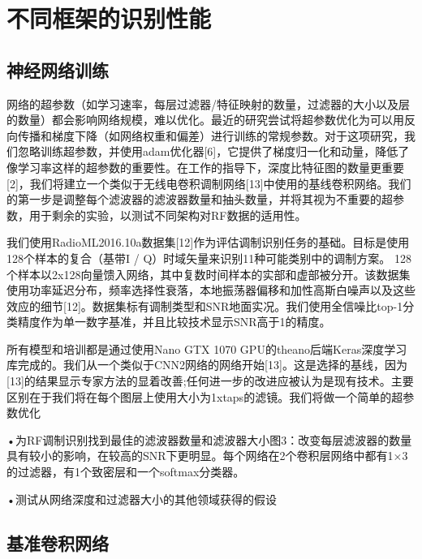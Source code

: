 \section{不同框架的识别性能}

\subsection{神经网络训练}

网络的超参数（如学习速率，每层过滤器/特征映射的数量，过滤器的大小以及层的数量）都会影响网络规模，难以优化。最近的研究尝试将超参数优化为可以用反向传播和梯度下降（如网络权重和偏差）进行训练的常规参数。对于这项研究，我们忽略训练超参数，并使用adam优化器[6]，它提供了梯度归一化和动量，降低了像学习率这样的超参数的重要性。在工作的指导下，深度比特征图的数量更重要[2]，我们将建立一个类似于无线电卷积调制网络[13]中使用的基线卷积网络。我们的第一步是调整每个滤波器的滤波器数量和抽头数量，并将其视为不重要的超参数，用于剩余的实验，以测试不同架构对RF数据的适用性。\par

我们使用RadioML2016.10a数据集[12]作为评估调制识别任务的基础。目标是使用128个样本的复合（基带I / Q）时域矢量来识别11种可能类别中的调制方案。 128个样本以2x128向量馈入网络，其中复数时间样本的实部和虚部被分开。该数据集使用功率延迟分布，频率选择性衰落，本地振荡器偏移和加性高斯白噪声以及这些效应的细节[12]。数据集标有调制类型和SNR地面实况。我们使用全信噪比top-1分类精度作为单一数字基准，并且比较技术显示SNR高于1的精度。\par

所有模型和培训都是通过使用Nano GTX 1070 GPU的theano后端Keras深度学习库完成的。我们从一个类似于CNN2网络的网络开始[13]。这是选择的基线，因为[13]的结果显示专家方法的显着改善;任何进一步的改进应被认为是现有技术。主要区别在于我们将在每个图层上使用大小为1xtaps的滤镜。我们将做一个简单的超参数优化\par

•为RF调制识别找到最佳的滤波器数量和滤波器大小图3：改变每层滤波器的数量具有较小的影响，在较高的SNR下更明显。每个网络在2个卷积层网络中都有1×3的过滤器，有1个致密层和一个softmax分类器。\par

•测试从网络深度和过滤器大小的其他领域获得的假设\par

\subsection{基准卷积网络}

